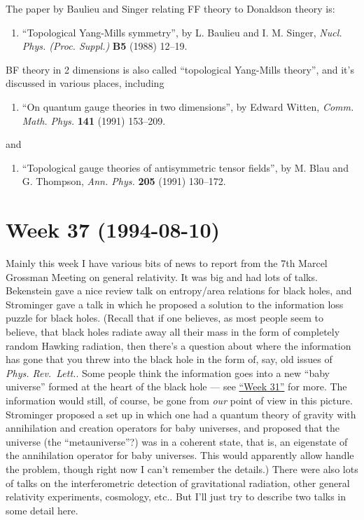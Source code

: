 \documentclass{article}
\def\tightlist{}
\begin{document}
The paper by Baulieu and Singer relating FF theory to Donaldson theory
is:

\begin{enumerate}
\def\labelenumi{\arabic{enumi})}
\setcounter{enumi}{3}
\tightlist
\item
  ``Topological Yang-Mills symmetry'', by L. Baulieu and I. M. Singer,
  \emph{Nucl. Phys. (Proc. Suppl.)} \textbf{B5} (1988) 12--19.
\end{enumerate}

BF theory in 2 dimensions is also called ``topological Yang-Mills
theory'', and it's discussed in various places, including

\begin{enumerate}
\def\labelenumi{\arabic{enumi})}
\setcounter{enumi}{4}
\tightlist
\item
  ``On quantum gauge theories in two dimensions'', by Edward Witten,
  \emph{Comm. Math. Phys.} \textbf{141} (1991) 153--209.
\end{enumerate}

and

\begin{enumerate}
\def\labelenumi{\arabic{enumi})}
\setcounter{enumi}{5}
\tightlist
\item
  ``Topological gauge theories of antisymmetric tensor fields'', by M.
  Blau and G. Thompson, \emph{Ann. Phys.} \textbf{205} (1991) 130--172.
\end{enumerate}
\hypertarget{week37}{%
\section{Week 37 (1994-08-10)}\label{week37}}

Mainly this week I have various bits of news to report from the 7th
Marcel Grossman Meeting on general relativity. It was big and had lots
of talks. Bekenstein gave a nice review talk on entropy/area relations
for black holes, and Strominger gave a talk in which he proposed a
solution to the information loss puzzle for black holes. (Recall that if
one believes, as most people seem to believe, that black holes radiate
away all their mass in the form of completely random Hawking radiation,
then there's a question about where the information has gone that you
threw into the black hole in the form of, say, old issues of \emph{Phys.
Rev.~Lett.}. Some people think the information goes into a new ``baby
universe'' formed at the heart of the black hole --- see
\protect\hyperlink{week31}{``Week 31''} for more. The information would
still, of course, be gone from \emph{our} point of view in this picture.
Strominger proposed a set up in which one had a quantum theory of
gravity with annihilation and creation operators for baby universes, and
proposed that the universe (the ``metauniverse''?) was in a coherent
state, that is, an eigenstate of the annihilation operator for baby
universes. This would apparently allow handle the problem, though right
now I can't remember the details.) There were also lots of talks on the
interferometric detection of gravitational radiation, other general
relativity experiments, cosmology, etc.. But I'll just try to describe
two talks in some detail here.
\end{document}
